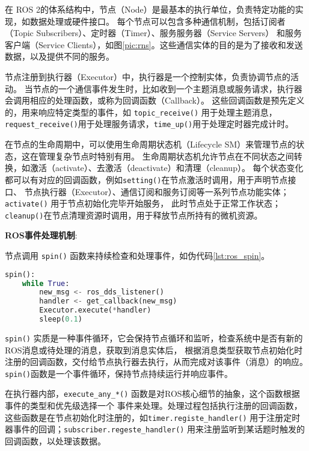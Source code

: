 
在 ROS 2的体系结构中，节点（Node）是最基本的执行单位，负责特定功能的实现，如数据处理或硬件接口。
每个节点可以包含多种通信机制，包括订阅者（Topic Subscribers）、定时器（Timer）、服务服务器（Service Servers）
和服务客户端（Service Clients），如图\ref{pic:rns}。这些通信实体的目的是为了接收和发送数据，以及提供不同的服务。

节点注册到执行器（Executor）中，执行器是一个控制实体，负责协调节点的活动。
当节点的一个通信事件发生时，比如收到一个主题消息或服务请求，执行器会调用相应的处理函数，或称为回调函数（Callback）。
这些回调函数是预先定义的，用来响应特定类型的事件，如 \texttt{topic\_receive()} 用于处理主题消息，
\texttt{request\_receive()}用于处理服务请求，\texttt{time\_up()}用于处理定时器完成计时。

在节点的生命周期中，可以使用生命周期状态机（Lifecycle SM）来管理节点的状态，这在管理复杂节点时特别有用。
生命周期状态机允许节点在不同状态之间转换，如激活（activate）、去激活（deactivate）和清理（cleanup）。
每个状态变化都可以有对应的回调函数，例如\texttt{setting()}在节点激活时调用，用于声明节点接口、
节点执行器（Executor）、通信订阅和服务订阅等一系列节点功能实体；\texttt{activate()} 用于节点初始化完毕开始服务，
此时节点处于正常工作状态； \texttt{cleanup()}在节点清理资源时调用，用于释放节点所持有的微机资源。

\textbf{ROS事件处理机制}: 

节点调用 \texttt{spin()} 函数来持续检查和处理事件，如伪代码\ref{lst:ros_spin}。

\begin{lstlisting}[language=Python, caption=ROS2事件循环示例, label=lst:ros_spin]
spin():
    while True:
        new_msg <- ros_dds_listener()
        handler <- get_callback(new_msg)
        Executor.execute(*handler)
        sleep(0.1)
\end{lstlisting}

\texttt{spin()} 实质是一种事件循环，它会保持节点循环和监听，检查系统中是否有新的ROS消息或待处理的消息，获取到消息实体后，
根据消息类型获取节点初始化时注册的回调函数，交付给节点执行器去执行，从而完成对该事件（消息）的响应。
\texttt{spin()}函数是一个事件循环，保持节点持续运行并响应事件。

在执行器内部，\texttt{execute\_any\_*()} 函数是对ROS核心细节的抽象，这个函数根据事件的类型和优先级选择一个
事件来处理。处理过程包括执行注册的回调函数，这些函数是在节点初始化时注册的，如\texttt{timer.registe\_handler()} 
用于注册定时器事件的回调；\texttt{subscriber.regeste\_handler()} 用来注册监听到某话题时触发的回调函数，以处理该数据。

